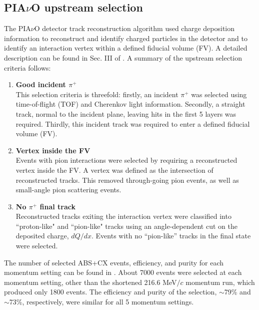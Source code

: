 \subsection{PIA$\nu$O upstream selection}
The PIA$\nu$O detector track reconstruction algorithm used charge deposition information to reconstruct and identify charged particles in the detector and to identify an interaction vertex within a defined fiducial volume (FV). A detailed description can be found in Sec. III of \cite{duet}. A summary of the upstream selection criteria follows:
\begin{enumerate}
\item {\bf Good incident $\pi^{+}$\\}
This selection criteria is threefold: firstly, an incident $\pi^{+}$ was selected using time-of-flight (TOF) and Cherenkov light information. Secondly, a straight track, normal to the incident plane, leaving hits in the first 5 layers was required. Thirdly, this incident track was required to enter a defined fiducial volume (FV).
\item {\bf Vertex inside the FV\\}
Events with pion interactions were selected by requiring a reconstructed vertex inside the FV.  A vertex was defined as the intersection of reconstructed tracks. This removed through-going pion events, as well as small-angle pion scattering events.
\item {\bf No $\pi^{+}$ final track\\}
Reconstructed tracks exiting the interaction vertex were classified into ``proton-like" and ``pion-like" tracks using an angle-dependent cut on the deposited charge, $dQ/dx$. Events with no ``pion-like'' tracks in the final state were selected.
\end{enumerate}
The number of selected ABS+CX events, efficiency, and purity for each momentum setting can be found in \cite{duet}. About 7000 events were selected at each momentum setting, other than the shortened 216.6 MeV$/c$ momentum run, which produced only 1800 events. The efficiency and purity of the selection, $\sim$79\% and $\sim$73\%, respectively, were similar for all 5 momentum settings.

